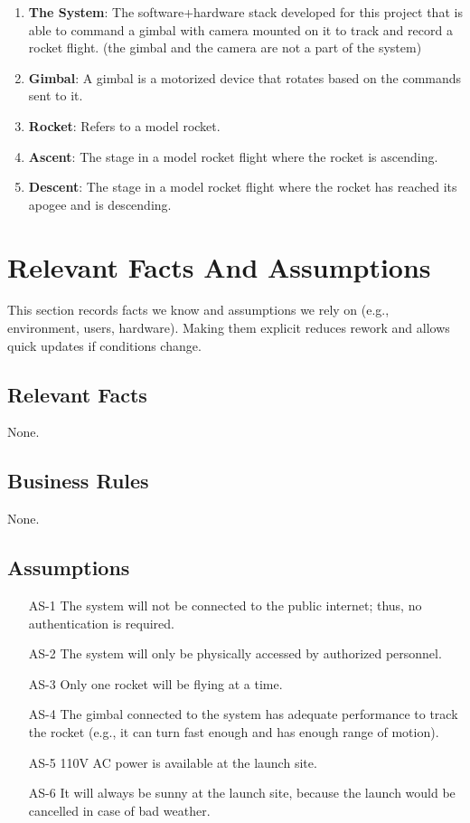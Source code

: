 \documentclass[12pt]{article}
\begin{document}
\begin{enumerate}
  \item \textbf{The System}: The software+hardware stack developed for this project that is able to command a gimbal with camera mounted on it to track and record a rocket flight. (the gimbal and the camera are not a part of the system)
  \item \textbf{Gimbal}: A gimbal is a motorized device that rotates based on the commands sent to it.
  \item \textbf{Rocket}: Refers to a model rocket.
  \item \textbf{Ascent}: The stage in a model rocket flight where the rocket is ascending.
  \item \textbf{Descent}: The stage in a model rocket flight where the rocket has reached its apogee and is descending.
\end{enumerate}

\section{Relevant Facts And Assumptions}
This section records facts we know and assumptions we rely on (e.g.,
environment, users, hardware). Making them explicit reduces rework and allows
quick updates if conditions change.

\subsection{Relevant Facts}

None.

\subsection{Business Rules}

None.

\subsection{Assumptions}

\begin{itemize}[leftmargin=*]
  \item[AS-1] The system will not be connected to the public internet; thus, no
        authentication is required.
  \item[AS-2] The system will only be physically accessed by authorized personnel.
  \item[AS-3] Only one rocket will be flying at a time.
  \item[AS-4] The gimbal connected to the system has adequate performance to track the
        rocket (e.g., it can turn fast enough and has enough range of motion).
  \item[AS-5] 110V AC power is available at the launch site.
  \item[AS-6] It will always be sunny at the launch site, because the launch would be
        cancelled in case of bad weather.
\end{itemize}
\end{document}
